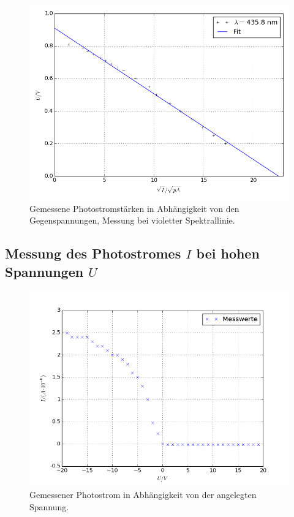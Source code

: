 \begin{figure}[pt]
	\centering
	\includegraphics[width=\textwidth]{Bilder/Fit_violett.png}
	\caption{Gemessene Photostromstärken in Abhängigkeit von den Gegenspannungen, Messung bei violetter Spektrallinie.\cite{matplotlib}}
	\label{fig:uidiagramm2}
\end{figure}


\subsection{Messung des \texorpdfstring{Photostromes $I$}{Photostromes} bei hohen \texorpdfstring{Spannungen $U$}{Spannungen}}
\label{sec:Auswertung2}
\begin{figure}[h]
	\centering
	\includegraphics[width=\textwidth]{Bilder/messung2.png}
	\caption{Gemessener Photostrom in Abhängigkeit von der angelegten Spannung.\cite{matplotlib}}
	\label{fig:uidiagramm3}
\end{figure}


